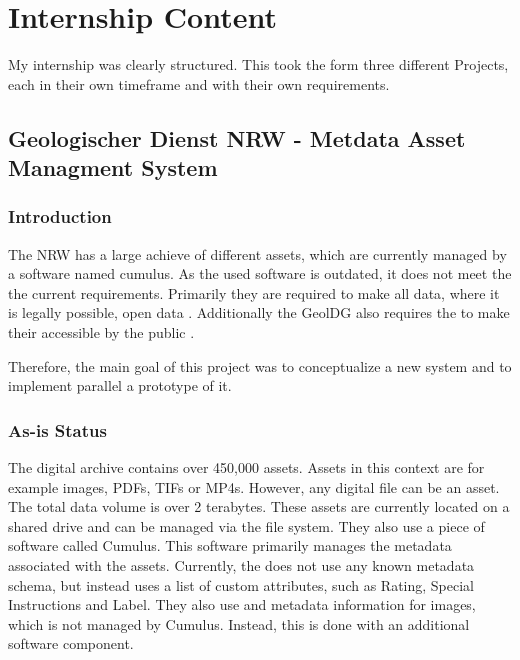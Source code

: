 \documentclass[11pt, titlepage, a4paper]{article}
\begin{document}
\section{Internship Content}

My internship was clearly structured. This took the form three different Projects, each in their own timeframe and with their own requirements.

\subsection{Geologischer Dienst NRW - Metdata Asset Managment System}
\subsubsection{Introduction}
The   NRW has a large achieve of different assets, which are currently managed by a software named cumulus. As the used software is outdated, it does not meet the the current requirements.
Primarily they  are required to make all data, where it is legally possible, open data \cite{GesetzZurForderung2017}.
Additionally the GeolDG also requires the  to make their accessible by the public \cite{GesetzZurStaatlichen2020}.

Therefore, the main goal of this project was to conceptualize a new system and to implement parallel a prototype of it.
\subsubsection{As-is Status}
The  digital archive contains over 450,000 assets. Assets in this context are for example images, PDFs, TIFs or MP4s. However, any digital file can be an asset. The total data volume is over 2 terabytes.
These assets are currently located on a shared drive and can be managed via the file system. They also use a piece of software called Cumulus. This software primarily manages the metadata associated with the assets. Currently, the  does not use any known metadata schema, but instead uses a list of custom attributes, such as Rating, Special Instructions and Label.
They also use  and  metadata information for images, which is not managed by Cumulus. Instead, this is done with an additional software component. %
\end{document}
